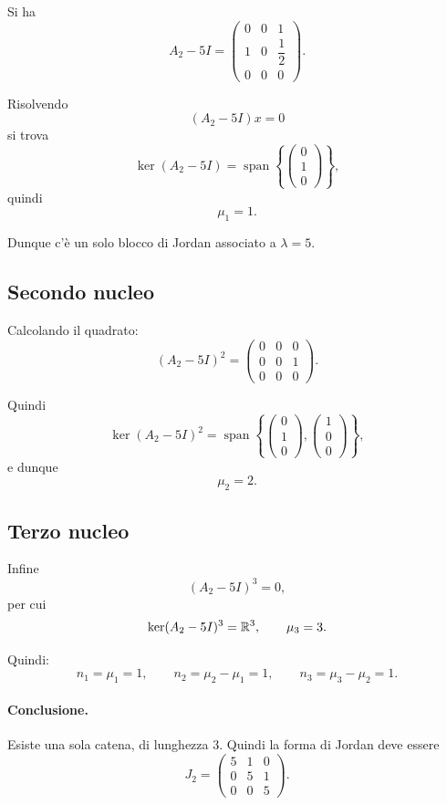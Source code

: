 Si ha
\[
A_2 - 5I =
\begin{pmatrix}
0 & 0 & 1\\
1 & 0 & \dfrac12\\
0 & 0 & 0
\end{pmatrix}.
\]

Risolvendo
\[
(A_2-5I)x=0
\]
si trova
\[
\ker(A_2-5I)=\operatorname{span}\left\{
\begin{pmatrix}
0\\
1\\
0
\end{pmatrix}
\right\},
\]
quindi
\[
\mu_1 = 1.
\]

Dunque c'è un solo blocco di Jordan associato a $\lambda=5$.

\subsection*{Secondo nucleo}

Calcolando il quadrato:
\[
(A_2-5I)^2 =
\begin{pmatrix}
0 & 0 & 0\\
0 & 0 & 1\\
0 & 0 & 0
\end{pmatrix}.
\]

Quindi
\[
\ker(A_2-5I)^2
=
\operatorname{span}\left\{
\begin{pmatrix}
0\\
1\\
0
\end{pmatrix},
\begin{pmatrix}
1\\
0\\
0
\end{pmatrix}
\right\},
\]
e dunque
\[
\mu_2 = 2.
\]

\subsection*{Terzo nucleo}

Infine
\[
(A_2-5I)^3 = 0,
\]
per cui
\[
\ker(A_2-5I)^3 = \mathbb{R}^3,
\qquad
\mu_3=3.
\]

Quindi:
\[
n_1 = \mu_1 = 1,\qquad
n_2 = \mu_2 - \mu_1 = 1,\qquad
n_3 = \mu_3 - \mu_2 = 1.
\]

\paragraph{Conclusione.}
Esiste una sola catena, di lunghezza $3$.  
Quindi la forma di Jordan deve essere
\[
J_2=
\begin{pmatrix}
5 & 1 & 0\\
0 & 5 & 1\\
0 & 0 & 5
\end{pmatrix}.
\]

